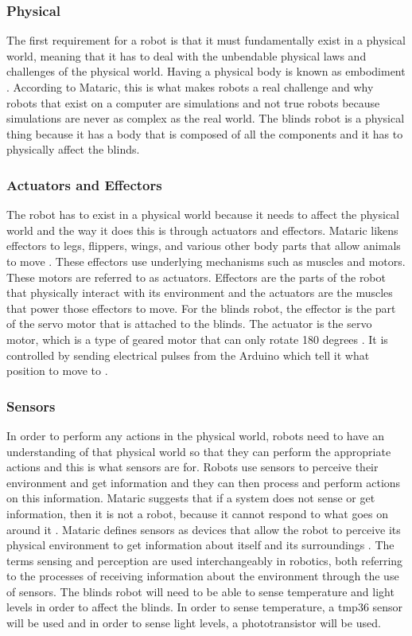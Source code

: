 \documentclass[10pt,twocolumn]{article}
\begin{document}
\subsubsection{Physical}
The first requirement for a robot is that it must fundamentally exist in a physical world, meaning that it has to deal with the unbendable physical laws and challenges of the physical world. Having a physical body is known as embodiment \cite{Mataric2007TheRoboticsPrimer}. According to Mataric, this is what makes robots a real challenge and why robots that exist on a computer are simulations and not true robots because simulations are never as complex as the real world. The blinds robot is a physical thing because it has a body that is composed of all the components and it has to physically affect the blinds.

\subsubsection{Actuators and Effectors}
The robot has to exist in a physical world because it needs to affect the physical world and the way it does this is through actuators and effectors. Mataric likens effectors to legs, flippers, wings, and various other body parts that allow animals to move \cite{Mataric2007TheRoboticsPrimer}. These effectors use underlying mechanisms such as muscles and motors. These motors are referred to as actuators. Effectors are the parts of the robot that physically interact with its environment and the actuators are the muscles that power those effectors to move. For the blinds robot, the effector is the part of the servo motor that is attached to the blinds. The actuator is the servo motor, which is a type of geared motor that can only rotate 180 degrees \cite{Fitzgerald2015Arduino}. It is controlled by sending electrical pulses from the Arduino which tell it what position to move to \cite{Fitzgerald2015Arduino}.

\subsubsection{Sensors}
In order to perform any actions in the physical world, robots need to have an understanding of that physical world so that they can perform the appropriate actions and this is what sensors are for. Robots use sensors to perceive their environment and get information and they can then process and perform actions on this information. Mataric suggests that if a system does not sense or get information, then it is not a robot, because it cannot respond to what goes on around it \cite{Mataric2007TheRoboticsPrimer}. Mataric defines sensors as devices that allow the robot to perceive its physical environment to get information about itself and its surroundings \cite{Mataric2007TheRoboticsPrimer}. The terms sensing and perception are used interchangeably in robotics, both referring to the processes of receiving information about the environment through the use of sensors. The blinds robot will need to be able to sense temperature and light levels in order to affect the blinds. In order to sense temperature, a tmp36 sensor will be used and in order to sense light levels, a phototransistor will be used.
\end{document}
